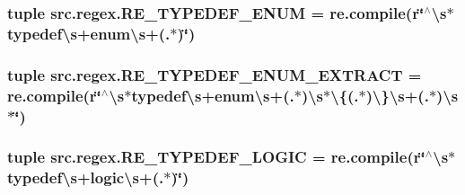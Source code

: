 \hypertarget{namespacesrc_1_1regex_a00196e0e53675c02e259668b26109c8f}{
\subsubsection[{R\-E\-\_\-\-T\-Y\-P\-E\-D\-E\-F\-\_\-\-E\-N\-U\-M}]{\setlength{\rightskip}{0pt plus 5cm}tuple src.\-regex.\-R\-E\-\_\-\-T\-Y\-P\-E\-D\-E\-F\-\_\-\-E\-N\-U\-M = re.\-compile(r\char`\"{}$^\wedge$\textbackslash{}s$\ast$typedef\textbackslash{}s+enum\textbackslash{}s+(.$\ast$)\char`\"{})}}\label{namespacesrc_1_1regex_a00196e0e53675c02e259668b26109c8f}
\hypertarget{namespacesrc_1_1regex_aae8c1f2567933a0d6a12bdc2ab505baf}{
\subsubsection[{R\-E\-\_\-\-T\-Y\-P\-E\-D\-E\-F\-\_\-\-E\-N\-U\-M\-\_\-\-E\-X\-T\-R\-A\-C\-T}]{\setlength{\rightskip}{0pt plus 5cm}tuple src.\-regex.\-R\-E\-\_\-\-T\-Y\-P\-E\-D\-E\-F\-\_\-\-E\-N\-U\-M\-\_\-\-E\-X\-T\-R\-A\-C\-T = re.\-compile(r\char`\"{}$^\wedge$\textbackslash{}s$\ast$typedef\textbackslash{}s+enum\textbackslash{}s+(.$\ast$)\textbackslash{}s$\ast$\textbackslash{}\{(.$\ast$)\textbackslash{}\}\textbackslash{}s+(.$\ast$)\textbackslash{}s$\ast$\char`\"{})}}\label{namespacesrc_1_1regex_aae8c1f2567933a0d6a12bdc2ab505baf}
\hypertarget{namespacesrc_1_1regex_a41964b62a783025d50229dd3b1839d95}{
\subsubsection[{R\-E\-\_\-\-T\-Y\-P\-E\-D\-E\-F\-\_\-\-L\-O\-G\-I\-C}]{\setlength{\rightskip}{0pt plus 5cm}tuple src.\-regex.\-R\-E\-\_\-\-T\-Y\-P\-E\-D\-E\-F\-\_\-\-L\-O\-G\-I\-C = re.\-compile(r\char`\"{}$^\wedge$\textbackslash{}s$\ast$typedef\textbackslash{}s+logic\textbackslash{}s+(.$\ast$)\char`\"{})}}\label{namespacesrc_1_1regex_a41964b62a783025d50229dd3b1839d95}
